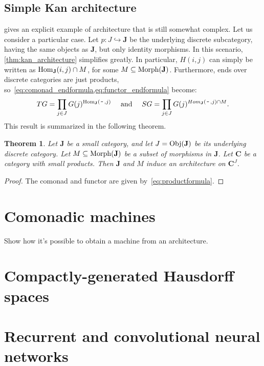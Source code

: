 \documentclass[12pt]{article}
\newtheorem{theorem}{Theorem}
\newcommand{\Hom}{{\textnormal{Hom}}}
\newcommand{\Obj}{{\textnormal{Obj}}}
\newcommand{\Morph}{{\textnormal{Morph}}}
\newcommand{\Cat}{{\mathbf{C}}}
\newcommand{\JCat}{{\mathbf{J}}}
\newcommand{\anon}{{\,\mbox{-}\,}}
\begin{document}
\subsection{Simple Kan architecture}

 gives an explicit example of architecture that is still somewhat complex. Let us consider a particular case. Let  $p\colon J \hookrightarrow \JCat$ be the underlying discrete subcategory, having the same objects as $\JCat$, but only identity morphisms. In this scenario, \cref{thm:kan_architecture} simplifies greatly. In particular, $H(i, j)$ can simply be written as $\Hom_\JCat(i, j) \cap M$, for some $M \subseteq \Morph(\JCat)$. Furthermore, ends over discrete categories are just products, so~\cref{eq:comonad_endformula,eq:functor_endformula} become:
\begin{equation}\label{eq:productformula}
    T G = \prod_{j \in J} G(j)^{\Hom_\JCat(\anon, j)}
    \quad\text{ and }\quad
    S G = \prod_{j \in J} G(j)^{Hom_\JCat(\anon, j) \cap M}.
\end{equation}
This result is summarized in the following theorem.

\begin{theorem}\label{thm:discrete_kan_architecture}
    Let $\JCat$ be a small category, and let $J = \Obj(\JCat)$ be its underlying discrete category. Let $M \subseteq \Morph(\JCat)$ be a subset of morphisms in $\JCat$. Let $\Cat$ be a category with small products. Then $\JCat$ and $M$ induce an architecture on $\Cat^J$.
\end{theorem}

\begin{proof}
    The comonad and functor are given by~\cref{eq:productformula}.
\end{proof}

\section{Comonadic machines}

Show how it's possible to obtain a machine from an architecture.

\section{Compactly-generated Hausdorff spaces}



\section{Recurrent and convolutional neural networks}
\end{document}
